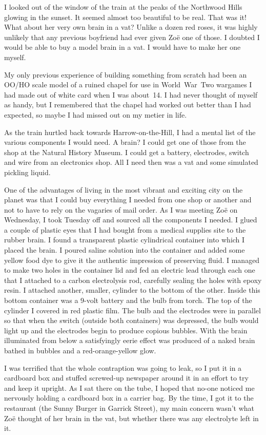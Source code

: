 I looked out of the window of the train at the peaks of the
Northwood Hills glowing in the sunset. It seemed almost too
beautiful to be real. That was it! What about her very own brain in
a vat? Unlike a dozen red roses, it was highly unlikely that any
previous boyfriend had ever given Zoë one of those. I doubted I
would be able to buy a model brain in a vat. I would have to make
her one myself.

My only previous experience of building something from scratch had
been an OO/HO scale model of a ruined chapel for use in
World~War~Two wargames I had made out of white card when I was
about~14. I had never thought of myself as handy, but I remembered
that the chapel had worked out better than I had expected, so maybe
I had missed out on my metier in life.

As the train hurtled back towards Harrow-on-the-Hill, I had a mental
list of the various components I would need. A brain? I could get one of
those from the shop at the Natural History Museum. I could get a
battery, electrodes, switch and wire from an electronics shop. All I
need then was a vat and some simulated pickling liquid.

One of the advantages of living in the most vibrant and exciting
city on the planet was that I could buy everything I needed from one
shop or another and not to have to rely on the vagaries of mail
order. As I was meeting Zoë on Wednesday, I took Tuesday off
and sourced  all the components I needed. I glued a couple of
plastic eyes that I had bought from a medical supplies site to the
rubber brain. I found a transparent plastic cylindrical container
into which I placed the brain. I poured saline solution into the
container and added some yellow food dye to give it the authentic
impression of preserving fluid. I managed to make two holes in the
container lid and fed an electric lead through each one that I
attached to a carbon electrolysis rod, carefully sealing the holes
with epoxy resin. I attached another, smaller, cylinder to the
bottom of the other. Inside this bottom container was a 9-volt battery and the bulb from torch. The top of the
cylinder I covered in red plastic film. The bulb and the electrodes
were in parallel so that when the switch (outside both containers)
was depressed, the bulb would light up and the electrodes begin to
produce copious bubbles. With the brain illuminated from below a
satisfyingly eerie effect was produced of a naked brain bathed in
bubbles and a red-orange-yellow glow.

I was terrified that the whole contraption was going to leak, so I
put it in a cardboard box and stuffed screwed-up newspaper around it
in an effort to try and keep it upright. As I sat there on the tube,
I hoped that no-one noticed me nervously holding a cardboard box in
a carrier bag. By the time, I got it to the restaurant (the Sunny
Burger in Garrick Street), my main concern wasn't what Zoë
thought of her brain in the vat, but whether there was any
electrolyte left in it.

